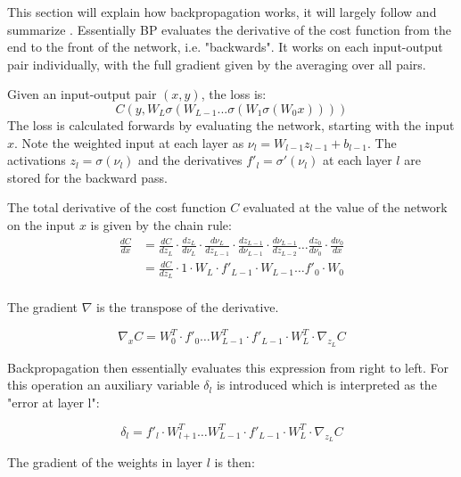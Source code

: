 This section will explain how backpropagation works, it will largely follow and summarize \cite{Nielsen2015}. Essentially BP evaluates the derivative of the cost function from the end to the front of the network, i.e. "backwards". It works on each input-output pair individually, with the full gradient given by the averaging over all pairs.

Given an input-output pair $(x,y)$, the loss is:
\begin{equation}
C(y,W_L\sigma(W_{L-1}...\sigma(W_1\sigma(W_0x))))
\end{equation}
The loss is calculated forwards by evaluating the network, starting with the input $x$. Note the weighted input at each layer as $\nu_l = W_{l-1}z_{l-1} + b_{l-1}$. The activations $z_l = \sigma(\nu_l)$ and the derivatives $f'_l = \sigma'(\nu_l)$ at each layer $l$ are stored for the backward pass.

The total derivative of the cost function $C$ evaluated at the value of the network on the input $x$ is given by the chain rule:
\begin{equation}
	\begin{aligned}
	\frac{dC}{dx} &= \frac{dC}{dz_L}\cdot \frac{dz_L}{d\nu_L}\cdot \frac{d\nu_L}{dz_{L-1}}\cdot \frac{dz_{L-1}}{d\nu_{L-1}} \cdot \frac{d\nu_{L-1}}{dz_{L-2}}\dots\frac{dz_0}{d\nu_0}\cdot\frac{d\nu_0}{dx} \\
	&= \frac{dC}{dz_L}\cdot 1 \cdot W_L \cdot f'_{L-1} \cdot W_{L-1} \dots f'_0 \cdot W_0 \\
	\end{aligned}
\end{equation}

The gradient $\nabla$ is the transpose of the derivative.

\begin{equation}
\nabla_xC = W_0^T \cdot f'_0 \dots W_{L-1}^T \cdot f'_{L-1} \cdot W_L^T \cdot \nabla_{z_L}C
\end{equation}

Backpropagation then essentially evaluates this expression from right to left. For this operation an auxiliary variable $\delta_l$ is introduced which is interpreted as the "error at layer l":

\begin{equation}
\delta_l = f'_l \cdot W_{l+1}^T \dots W_{L-1}^T \cdot f'_{L-1} \cdot W_L^T \cdot \nabla_{z_L}C
\end{equation}

The gradient of the weights in layer $l$ is then:

